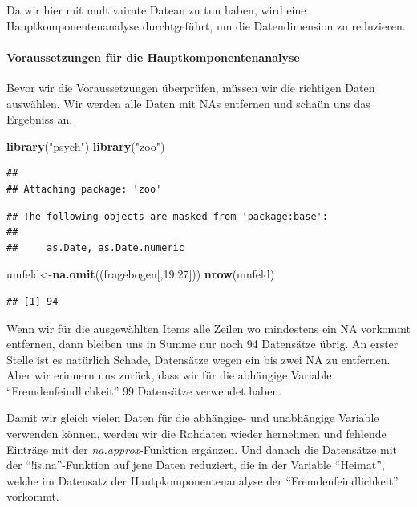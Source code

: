 \documentclass[]{article}
\newenvironment{Shaded}{\begin{snugshade}}{\end{snugshade}}
\newcommand{\KeywordTok}[1]{\textcolor[rgb]{0.13,0.29,0.53}{\textbf{{#1}}}}
\newcommand{\DecValTok}[1]{\textcolor[rgb]{0.00,0.00,0.81}{{#1}}}
\newcommand{\StringTok}[1]{\textcolor[rgb]{0.31,0.60,0.02}{{#1}}}
\newcommand{\NormalTok}[1]{{#1}}
\let\oldparagraph\paragraph
\renewcommand{\paragraph}[1]{\oldparagraph{#1}\mbox{}}
\begin{document}
Da wir hier mit multivairate Datean zu tun haben, wird eine
Hauptkomponentenanalyse durchtgeführt, um die Datendimension zu
reduzieren.

\paragraph{Voraussetzungen für die
Hauptkomponentenanalyse}\label{voraussetzungen-fur-die-hauptkomponentenanalyse}

Bevor wir die Voraussetzungen überprüfen, müssen wir die richtigen Daten
auswählen. Wir werden alle Daten mit NAs entfernen und schaün uns das
Ergebniss an.

\begin{Shaded}
\begin{Highlighting}[]
\KeywordTok{library}\NormalTok{(}\StringTok{"psych"}\NormalTok{)}
\KeywordTok{library}\NormalTok{(}\StringTok{"zoo"}\NormalTok{)}
\end{Highlighting}
\end{Shaded}

\begin{verbatim}
## 
## Attaching package: 'zoo'
\end{verbatim}

\begin{verbatim}
## The following objects are masked from 'package:base':
## 
##     as.Date, as.Date.numeric
\end{verbatim}

\begin{Shaded}
\begin{Highlighting}[]
\NormalTok{umfeld<-}\KeywordTok{na.omit}\NormalTok{((fragebogen[,}\DecValTok{19}\NormalTok{:}\DecValTok{27}\NormalTok{]))}
\KeywordTok{nrow}\NormalTok{(umfeld)}
\end{Highlighting}
\end{Shaded}

\begin{verbatim}
## [1] 94
\end{verbatim}

Wenn wir für die ausgewählten Items alle Zeilen wo mindestens ein NA
vorkommt entfernen, dann bleiben uns in Summe nur noch 94 Datensätze
übrig. An erster Stelle ist es natürlich Schade, Datensätze wegen ein
bis zwei NA zu entfernen. Aber wir erinnern uns zurück, dass wir für die
abhängige Variable ``Fremdenfeindlichkeit'' 99 Datensätze verwendet
haben.

Damit wir gleich vielen Daten für die abhängige- und unabhängige
Variable verwenden können, werden wir die Rohdaten wieder hernehmen und
fehlende Einträge mit der \emph{na.approx}-Funktion ergänzen. Und danach
die Datensätze mit der ``!is.na''-Funktion auf jene Daten reduziert, die
in der Variable ``Heimat'', welche im Datensatz der
Hautpkomponentenanalyse der ``Fremdenfeindlichkeit'' vorkommt.
\end{document}
